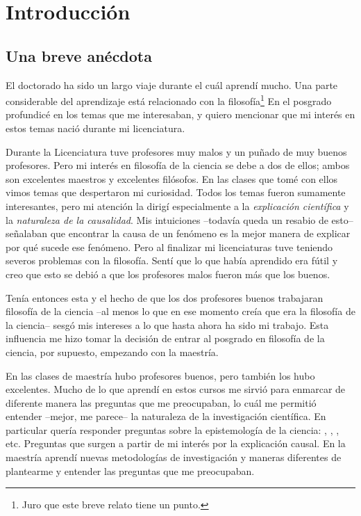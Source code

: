 
\chapter{Introducción}\label{ch:introduction}

\section{Una breve anécdota}

\noindent El doctorado ha sido un largo viaje durante el cuál aprendí mucho.
Una parte considerable del aprendizaje está relacionado con la filosofía\footnote{Juro que este breve relato tiene un punto.}
En el posgrado profundicé en los temas que me interesaban, y quiero mencionar que mi interés en estos temas nació durante mi licenciatura.

Durante la Licenciatura tuve profesores muy malos y un puñado de muy buenos profesores.
Pero mi interés en filosofía de la ciencia se debe a dos de ellos; ambos son excelentes maestros y excelentes filósofos.
En las clases que tomé con ellos vimos temas que despertaron mi curiosidad.
Todos los temas fueron sumamente interesantes, pero mi atención la dirigí especialmente a la \emph{explicación científica} y la \emph{naturaleza de la causalidad}.
Mis intuiciones --todavía queda un resabio de esto-- señalaban que encontrar la causa de un fenómeno es la mejor manera de explicar por qué sucede ese fenómeno.
Pero al finalizar mi licenciaturas tuve teniendo severos problemas con la filosofía.
Sentí que lo que había aprendido era fútil y creo que esto se debió a que los profesores malos fueron más que los buenos.

Tenía entonces esta  y el hecho de que los dos profesores buenos trabajaran filosofía de la ciencia --al menos lo que en ese momento creía que era la filosofía de la ciencia-- sesgó mis intereses a lo que hasta ahora ha sido mi trabajo.
Esta influencia me hizo tomar la decisión de entrar al posgrado en filosofía de la ciencia, por supuesto, empezando con la maestría.

En las clases de maestría hubo profesores buenos, pero también los hubo excelentes.
Mucho de lo que aprendí en estos cursos me sirvió para enmarcar de diferente manera las preguntas que me preocupaban, lo cuál me permitió entender --mejor, me parece-- la naturaleza de la investigación científica.
En particular quería responder preguntas sobre la epistemología de la ciencia: , , , etc.
Preguntas que surgen a partir de mi interés por la explicación causal.
En la maestría aprendí nuevas metodologías de investigación y maneras diferentes de plantearme y entender las preguntas que me preocupaban.

